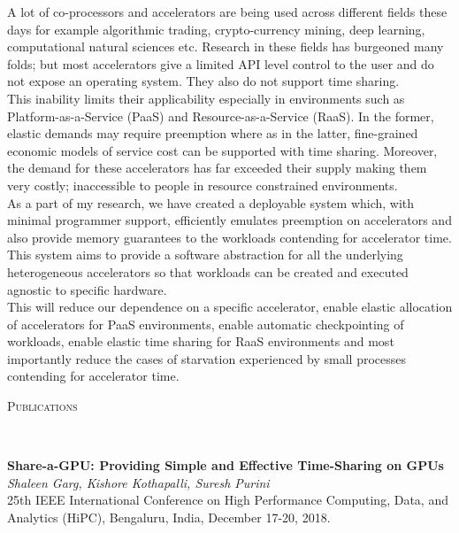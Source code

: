 \documentclass[10pt]{article}
\newenvironment{changemargin}[2]{%
    \begin{list}{}{%
            \setlength{\topsep}{0pt}%
            \setlength{\leftmargin}{#1}%
            \setlength{\rightmargin}{#2}%
            \setlength{\listparindent}{\parindent}%
        \setlength{\itemindent}{\parindent}%
            \setlength{\parsep}{\parskip}%
        }%
\item[]}{\end{list}
}
\newcommand{\lineover}{
    \begin{changemargin}{-0.05in}{-0.10in}
        \vspace*{-8pt}
        \hrulefill \\
        \vspace*{-2pt}
    \end{changemargin}
}
\newcommand{\header}[1]{
    \begin{changemargin}{-0.75in}{-0.75in}
        \scshape{#1}\\
        \lineover
    \end{changemargin}
}
\newenvironment{body} {
    \vspace*{-16pt}
    \begin{changemargin}{-0.6in}{-0.65in}
    }   
    {\end{changemargin}
}
\begin{document}
\begin{body}
    \vspace{14pt}
    \justifying
    A lot of co-processors and accelerators are being used across different fields these days for example algorithmic trading, crypto-currency mining, deep learning, computational natural sciences etc. Research in these fields has burgeoned many folds; but most accelerators give a limited API level control to the user and do not expose an operating system. They also do not support time sharing.
    \\
    This inability limits their applicability especially in environments such as Platform-as-a-Service (PaaS) and Resource-as-a-Service (RaaS). In the former, elastic demands may require preemption where as in the latter, fine-grained economic models of service cost can be supported with time sharing. Moreover, the demand for these accelerators has far exceeded their supply making them very costly; inaccessible to people in resource constrained environments.
    \\
    As a part of my research, we have created a deployable system which, with minimal programmer support, efficiently emulates preemption on accelerators and also provide memory guarantees to the workloads contending for accelerator time. This system aims to provide a software abstraction for all the underlying heterogeneous accelerators so that workloads can be created and executed agnostic to specific hardware.
    \\
    This will reduce our dependence on a specific accelerator, enable elastic allocation of accelerators for PaaS environments, enable automatic checkpointing of workloads, enable elastic time sharing for RaaS environments and most importantly reduce the cases of starvation experienced by small processes contending for accelerator time.
\end{body}
\smallskip
\header{Publications}

\begin{body}
    \vspace{14pt}
    \textbf{Share-a-GPU: Providing Simple and Effective Time-Sharing on GPUs}\\
    \emph{Shaleen Garg, Kishore Kothapalli, Suresh Purini}\\
    25th IEEE International Conference on High Performance Computing, Data, and Analytics (HiPC), Bengaluru, India, December 17-20, 2018.
    \smallskip 
\end{body}
\end{document}
